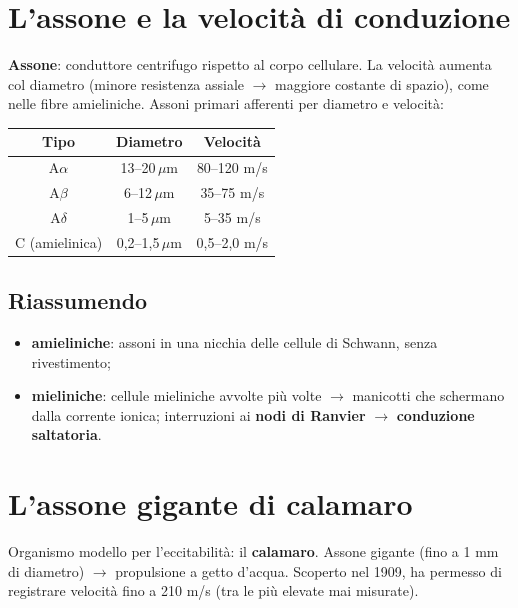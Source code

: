 \section{L'assone e la velocità di conduzione}

\textbf{Assone}: conduttore centrifugo rispetto al corpo cellulare. La velocità aumenta col
diametro (minore resistenza assiale $\rightarrow$ maggiore costante di spazio), come nelle fibre
amieliniche. Assoni primari afferenti per diametro e velocità:
\begin{table}[htbp]
  \centering \small \renewcommand{\arraystretch}{1.2}
  \begin{tabular}{|c|c|c|}
    \hline
    \textbf{Tipo} & \textbf{Diametro} & \textbf{Velocità} \\
    \hline
    A$\alpha$ & 13--20\,$\mu$m & 80--120 m/s \\
    A$\beta$  & 6--12\,$\mu$m  & 35--75 m/s \\
    A$\delta$ & 1--5\,$\mu$m   & 5--35 m/s \\
    C (amielinica) & 0,2--1,5\,$\mu$m & 0,5--2,0 m/s \\
    \hline
  \end{tabular}
\end{table}

\subsection{Riassumendo}
\begin{itemize}
  \item \textbf{amieliniche}: assoni in una nicchia delle cellule di Schwann, senza rivestimento;
  \item \textbf{mieliniche}: cellule mieliniche avvolte più volte $\rightarrow$ manicotti che
    schermano dalla corrente ionica; interruzioni ai \textbf{nodi di Ranvier} $\rightarrow$
    \textbf{conduzione saltatoria}.
\end{itemize}

\section{L'assone gigante di calamaro}

Organismo modello per l'eccitabilità: il \textbf{calamaro}. Assone gigante (fino a 1 mm di
diametro) $\rightarrow$ propulsione a getto d'acqua. Scoperto nel 1909, ha permesso di registrare
velocità fino a 210 m/s (tra le più elevate mai misurate).


